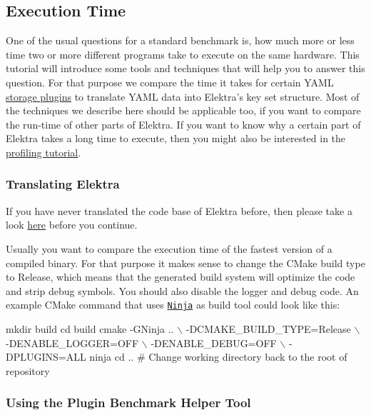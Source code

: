 \subsection*{Execution Time}

One of the usual questions for a standard benchmark is, how much more or less time two or more different programs take to execute on the same hardware. This tutorial will introduce some tools and techniques that will help you to answer this question. For that purpose we compare the time it takes for certain Y\+A\+ML \hyperlink{doc_tutorials_storage-plugins_md}{storage plugins} to translate Y\+A\+ML data into Elektra’s key set structure. Most of the techniques we describe here should be applicable too, if you want to compare the run-\/time of other parts of Elektra. If you want to know why a certain part of Elektra takes a long time to execute, then you might also be interested in the \hyperlink{doc_tutorials_profiling_md}{profiling tutorial}.

\subsubsection*{Translating Elektra}

If you have never translated the code base of Elektra before, then please take a look \hyperlink{doc_COMPILE_md}{here} before you continue.

Usually you want to compare the execution time of the fastest version of a compiled binary. For that purpose it makes sense to change the C\+Make build type to {\ttfamily Release}, which means that the generated build system will optimize the code and strip debug symbols. You should also disable the logger and debug code. An example C\+Make command that uses \href{https://ninja-build.org}{\tt Ninja} as build tool could look like this\+:


\begin{DoxyCode}
mkdir build
cd build
cmake -GNinja ..                 \(\backslash\)
      -DCMAKE\_BUILD\_TYPE=Release \(\backslash\)
      -DENABLE\_LOGGER=OFF        \(\backslash\)
      -DENABLE\_DEBUG=OFF         \(\backslash\)
      -DPLUGINS=ALL
ninja
cd .. # Change working directory back to the root of repository
\end{DoxyCode}


\subsubsection*{Using the Plugin Benchmark Helper Tool}

